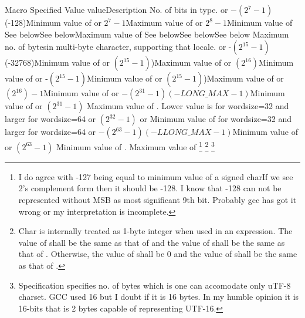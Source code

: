 {\starttable[|l|l|l|l| ]
\HL
\VL Macro \VL Specified Value\VL {} value\VL Description\VL\SR
\HL
\VL{}\VL No. of bits in  type.\VL\SR
\HL
\VL {} or $-(2^7-1)$\note[1]\VL
(-128)\VL Minimum value of \VL\SR
\HL
\VL {} or $2^7-1$\VL Maximum value of
  \VL\SR
\HL
\VL{} or $2^8-1$\VL Minimum value of
  \VL\SR
\HL
\VL{}\VL See below\note[2]\VL See below\note[2]\VL Maximum value of
  \VL\SR
\HL
\VL{}\VL See below\note[2]\VL See below\note[2]\VL See below\note[2]\VL\SR
\HL
\VL{}\VL Maximum no. of bytes\note[3] in\VL\SR
\VL\VL\VL\VL multi-byte character, supporting that locale.\VL\SR
\HL
\VL {} or -$(2^{15}-1)$\VL(-32768)\VL Minimum value
of \VL\SR
\HL
\VL {} or $(2^{15}-1)$)\VL Maximum value
of \VL\SR
\HL
\VL {} or $(2^{16})$\VL Minimum value
of \VL\SR
\HL
\VL {} or -$(2^{15}-1)$\VL{}\VL Minimum value
of \VL\SR
\HL
\VL {} or $(2^{15}-1)$)\VL Maximum value
of \VL\SR
\HL
\VL {} or $(2^{16})-1$\VL Minimum value
of \VL\SR
\HL
\VL {} or $−(2^{31} − 1)$\VL$(-LONG\_MAX - 1)$\VL Minimum value
of \VL\SR
\HL
\VL {} or $(2^{31}-1)$
\VL Maximum value of . Lower value is \VL\SR
\VL\VL{} \VL for wordsize=32 and larger for
wordsize=64\VL\SR
\HL
\VL {} or $(2^{32}-1)$ or \VL Minimum value
of \VL\SR
\VL\VL{}\VL for wordsize=32 and larger for
wordsize=64\VL\SR
\HL
\VL {} or $−(2^{63} − 1)$\VL$(-LLONG\_MAX - 1)$\VL Minimum value
of \VL\SR
\HL
\VL {} or $(2^{63}-1)$
\VL Minimum value of .\VL\SR
\HL
\VL {}\VL Maximum value
of \VL\SR
\HL
\stoptable}
\footnote[1]{I do agree with -127 being equal to minimum value of a \type
{signed char}If we see 2's complement form then it should be -128. I
know that -128 can not be represented without MSB as most significant
9th bit. Probably gcc has got it wrong or my interpretation is incomplete.}
\footnote[2]{Char is internally treated as 1-byte integer when used in
  an expression. The value of  shall be the same as that of
   and the value of  shall be the same as that of
  . Otherwise, the value of  shall be 0 and the
  value of  shall be the same as that of .}
\footnote[3]{Specification specifies no. of bytes which is one can
  accomodate only uTF-8 charset. GCC used 16 but I doubt if it is
  16 bytes. In my humble opinion it is 16-bits that is 2 bytes capable
  of representing UTF-16.}

